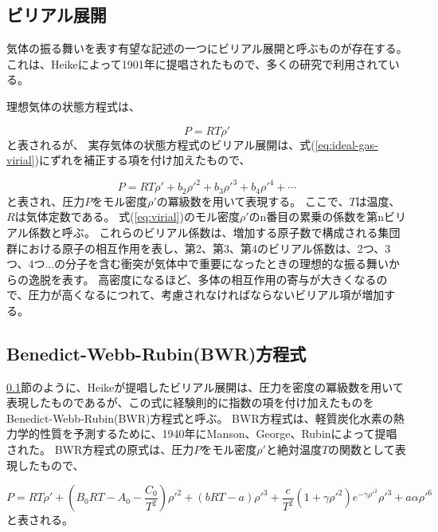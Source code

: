 \documentclass[titlepage]{jsreport}
\begin{document}
{{{\subsection{ビリアル展開}\label{method-subsec:virial}
気体の振る舞いを表す有望な記述の一つにビリアル展開と呼ぶものが存在する。
これは、Heikeによって1901年に提唱されたもの\cite{virial-Heike}で、多くの研究で利用されている\cite{virial-expansion-example1,virial-expansion-example2,virial-expansion-example3}。

理想気体の状態方程式は、

\large
\begin{equation}
P=RT{\rho}' \label{eq:ideal-gas-virial}
\end{equation}
\normalsize
と表されるが、
実存気体の状態方程式のビリアル展開は、式(\ref{eq:ideal-gas-virial})にずれを補正する項を付け加えたもので、

\large
\begin{equation}
P=RT{\rho}'+b_2{{\rho}'}^2+b_3{{\rho}'}^3+b_4{{\rho}'}^4+\cdots \label{eq:virial}
\end{equation}
\normalsize
と表され、圧力$P$をモル密度${\rho}'$の冪級数を用いて表現する。
ここで、$T$は温度、$R$は気体定数である。
式(\ref{eq:virial})のモル密度${\rho}'$のn番目の累乗の係数を第nビリアル係数と呼ぶ\cite{virial-expansion}。
これらのビリアル係数は、増加する原子数で構成される集団群における原子の相互作用を表し、第2、第3、第4のビリアル係数は、2つ、3つ、4つ...の分子を含む衝突が気体中で重要になったときの理想的な振る舞いからの逸脱を表す。
高密度になるほど、多体の相互作用の寄与が大きくなるので、圧力が高くなるにつれて、考慮されなければならないビリアル項が増加する\cite{virial-Heike}。

\subsection{Benedict-Webb-Rubin(BWR)方程式}\label{method-subsec:BWR}
\ref{method-subsec:virial}節のように、Heikeが提唱したビリアル展開は、圧力を密度の冪級数を用いて表現したものであるが、この式に経験則的に指数の項を付け加えたものをBenedict-Webb-Rubin(BWR)方程式と呼ぶ。
BWR方程式は、軽質炭化水素の熱力学的性質を予測するために、1940年にManson、George、Rubinによって提唱された\cite{BWR-equation:original}。
BWR方程式の原式は、圧力$P$をモル密度${\rho}'$と絶対温度$T$の関数として表現したもので、

\large
\begin{equation}
P=RT{\rho}'+\left(B_0RT-A_0-{\frac{C_0}{T^2}}\right){{\rho}'}^2+(bRT-a){{\rho}'}^3+{\frac{c}{T^2}}(1+{\gamma}{{\rho}'}^2)e^{-{\gamma}{{\rho}'}^2}{{\rho}'}^3+a{\alpha}{{\rho}'}^6\label{eq:BWR}
\end{equation}
\normalsize
と表される。

}}}
\end{document}
